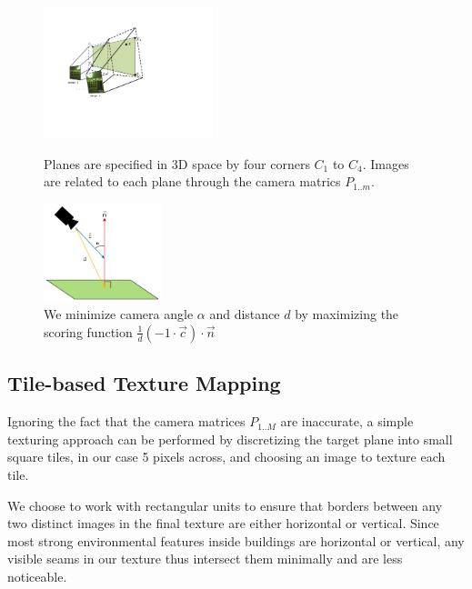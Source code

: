 \documentclass[]{spie}  %
\begin{document}
{  \begin{figure}
    \begin{minipage}[b]{0.45\linewidth}
      \centering
      \includegraphics[height=1.5in]{Projection.pdf}
      \caption{Planes are specified in 3D space by four corners $C_1$
        to $C_4$. Images are related to each plane through the camera
        matrics $P_{1..m}$. }
      \label{fig:projection}
    \end{minipage}
    \hspace{0.5cm}
    \begin{minipage}[b]{0.45\linewidth}
      \centering
      \includegraphics[height=1.125in]{scoringFunction.jpg}
      \caption{We minimize camera angle $\alpha$ and distance $d$ by
        maximizing the scoring function $\frac{1}{d} (-1 \cdot
        \vec{c}) \cdot \vec{n}$}
      \label{fig:scoringFunction}
    \end{minipage}
  \end{figure}


  \subsection{Tile-based Texture Mapping}
  \label{sec:tileBasedMapping}
  Ignoring the fact that the camera matrices $P_{1..M}$ are
  inaccurate, a simple texturing approach can be performed by
  discretizing the target plane into small square tiles, in our case 5
  pixels across, and choosing an image to texture each tile.

  We choose to work with rectangular units to ensure that borders
  between any two distinct images in the final texture are either
  horizontal or vertical. Since most strong environmental features
  inside buildings are horizontal or vertical, any visible seams in
  our texture thus intersect them minimally and are less noticeable.

}
\end{document}
